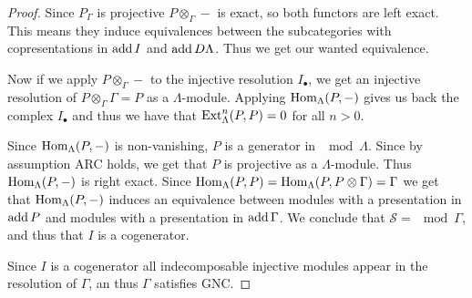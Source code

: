 \begin{theorem}
\begin{proof}
		Since $P_\Gamma$ is projective $P\otimes_\Gamma -$ is exact, so both functors are left exact. This means they induce equivalences between the subcategories with copresentations in $\operatorname{add} I$ and $\operatorname{add} D\Lambda$. Thus we get our wanted equivalence.
		
		Now if we apply $P\otimes_\Gamma -$ to the injective resolution $I_\bullet$, we get an injective resolution of $P\otimes_\Gamma\Gamma = P$ as a $\Lambda$-module. Applying $\operatorname{Hom}_\Lambda(P, -)$ gives us back the complex $I_\bullet$ and thus we have that $\operatorname{Ext}_\Lambda^n(P, P)=0$ for all $n>0$. 
		
		Since $\operatorname{Hom}_\Lambda(P, -)$ is non-vanishing, $P$ is a generator in $\mod\Lambda$. Since by assumption ARC holds, we get that $P$ is projective as a $\Lambda$-module. Thus $\operatorname{Hom}_\Lambda(P, -)$ is right exact. Since $\operatorname{Hom}_\Lambda(P, P) = \operatorname{Hom}_\Lambda(P, P\otimes \Gamma) = \Gamma$ we get that $\operatorname{Hom}_\Lambda(P,-)$ induces an equivalence between modules with a presentation in $\operatorname{add} P$ and modules with a presentation in $\operatorname{add} \Gamma$. We conclude that $\mathcal S = \mod\Gamma$, and thus that $I$ is a cogenerator.
		
		Since $I$ is a cogenerator all indecomposable injective modules appear in the resolution of $\Gamma$, an thus $\Gamma$ satisfies GNC.
	\end{proof}
\end{theorem}
%
%		
%		
